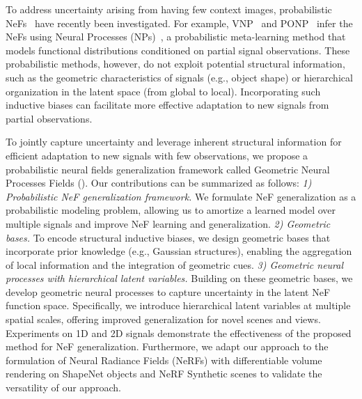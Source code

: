 To address uncertainty arising from having few context images, probabilistic NeFs~\citep{gu2023generalizable, guo2023versatile, kosiorek2021nerf} have recently been investigated. For example, VNP~\citep{guo2023versatile} and PONP~\citep{gu2023generalizable} infer the NeFs using Neural Processes (NPs)~\citep{bruinsma2023autoregressive, garnelo2018neural, wang2020doubly}, a probabilistic meta-learning method that models functional distributions conditioned on partial signal observations. These probabilistic methods, however, do not exploit potential structural information, such as the geometric characteristics of signals (e.g., object shape) or hierarchical organization in the latent space (from global to local). Incorporating such inductive biases can facilitate more effective adaptation to new signals from partial observations.

To jointly capture uncertainty and leverage inherent structural information for efficient adaptation to new signals with few observations, we propose a probabilistic neural fields generalization framework called Geometric Neural Processes Fields (\name{}). Our contributions can be summarized as follows:
\textit{1) Probabilistic NeF generalization framework.}  We formulate NeF generalization as a probabilistic modeling problem, allowing us to amortize a learned model over multiple signals and improve NeF learning and generalization.
\textit{2) Geometric bases.} 
To encode structural inductive biases, we design geometric bases that incorporate prior knowledge (e.g., Gaussian structures), enabling the aggregation of local information and the integration of geometric cues.
\textit{3) Geometric neural processes with hierarchical latent variables.}
Building on these geometric bases, we develop geometric neural processes to capture uncertainty in the latent NeF function space. Specifically, we introduce hierarchical latent variables at multiple spatial scales, offering improved generalization for novel scenes and views.
Experiments on 1D and 2D signals demonstrate the effectiveness of the proposed method for NeF generalization. Furthermore, we adapt our approach to the formulation of Neural Radiance Fields (NeRFs) with differentiable volume rendering on ShapeNet objects and NeRF Synthetic scenes to validate the versatility of our approach. 

